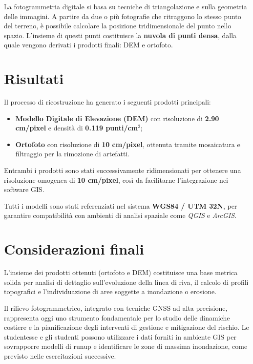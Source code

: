 \documentclass[9pt,a4paper,twocolumn,twoside]{tau-class/tau}
\begin{document}
La fotogrammetria digitale si basa su tecniche di triangolazione e sulla geometria delle immagini.  
A partire da due o più fotografie che ritraggono lo stesso punto del terreno, è possibile calcolare la posizione tridimensionale del punto nello spazio.  
L’insieme di questi punti costituisce la \textbf{nuvola di punti densa}, dalla quale vengono derivati i prodotti finali: DEM e ortofoto.


\section*{Risultati}

Il processo di ricostruzione ha generato i seguenti prodotti principali:
\begin{itemize}
    \item \textbf{Modello Digitale di Elevazione (DEM)} con risoluzione di \textbf{2.90 cm/pixel} e densità di \textbf{0.119 punti/cm$^2$};
    \item \textbf{Ortofoto} con risoluzione di \textbf{10 cm/pixel}, ottenuta tramite mosaicatura e filtraggio per la rimozione di artefatti.
\end{itemize}

Entrambi i prodotti sono stati successivamente ridimensionati per ottenere una risoluzione omogenea di \textbf{10 cm/pixel}, così da facilitarne l’integrazione nei software GIS.  

Tutti i modelli sono stati referenziati nel sistema \textbf{WGS84 / UTM 32N}, per garantire compatibilità con ambienti di analisi spaziale come \textit{QGIS} e \textit{ArcGIS}.


\section*{Considerazioni finali}

L’insieme dei prodotti ottenuti (ortofoto e DEM) costituisce una base metrica solida per analisi di dettaglio sull’evoluzione della linea di riva, il calcolo di profili topografici e l’individuazione di aree soggette a inondazione o erosione.  

Il rilievo fotogrammetrico, integrato con tecniche GNSS ad alta precisione, rappresenta oggi uno strumento fondamentale per lo studio delle dinamiche costiere e la pianificazione degli interventi di gestione e mitigazione del rischio.  
Le studentesse e gli studenti possono utilizzare i dati forniti in ambiente GIS per sovrapporre modelli di runup e identificare le zone di massima inondazione, come previsto nelle esercitazioni successive.
\end{document}
